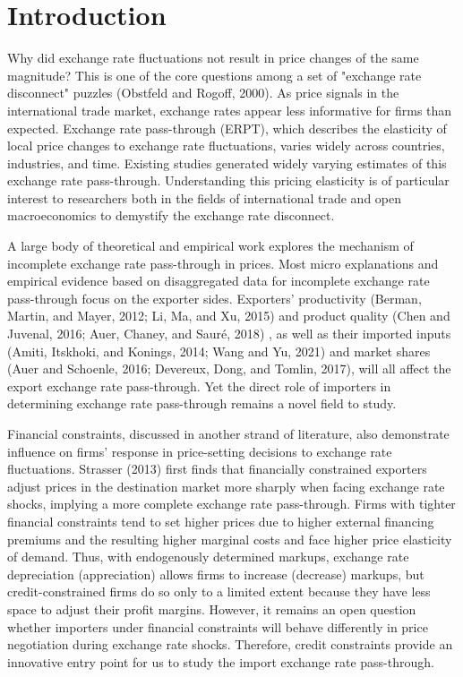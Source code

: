 \chapter{Introduction}\label{sec-1.introduction}

Why did exchange rate fluctuations not result in price changes of the same magnitude? This is one of the core questions among a set of "exchange rate disconnect" puzzles (Obstfeld and Rogoff, 2000\cite{obstfeld2000}). As price signals in the international trade market, exchange rates appear less informative for firms than expected. Exchange rate pass-through (ERPT), which describes the elasticity of local price changes to exchange rate fluctuations, varies widely across countries, industries, and time. Existing studies generated widely varying estimates of this exchange rate pass-through. Understanding this pricing elasticity is of particular interest to researchers both in the fields of international trade and open macroeconomics to demystify the exchange rate disconnect.

A large body of theoretical and empirical work explores the mechanism of incomplete exchange rate pass-through in prices. Most micro explanations and empirical evidence based on disaggregated data for incomplete exchange rate pass-through focus on the exporter sides. Exporters' productivity (Berman, Martin, and Mayer, 2012\cite{bmm2012}; Li, Ma, and Xu, 2015\cite{lmx2015}) and product quality (Chen and Juvenal, 2016\cite{chen2016}; Auer, Chaney, and Sauré, 2018\cite{auer2018}) , as well as their imported inputs (Amiti, Itskhoki, and Konings, 2014\cite{aik2014}; Wang and Yu, 2021\cite{wang-yu2021}) and market shares (Auer and Schoenle, 2016\cite{auer2016}; Devereux, Dong, and Tomlin, 2017\cite{devereux2017}), will all affect the export exchange rate pass-through. Yet the direct role of importers in determining exchange rate pass-through remains a novel field to study. 

Financial constraints, discussed in another strand of literature, also demonstrate influence on firms’ response in price-setting decisions to exchange rate fluctuations. Strasser (2013)\cite{strasser2013} first finds that financially constrained exporters adjust prices in the destination market more sharply when facing exchange rate shocks, implying a more complete exchange rate pass-through. Firms with tighter financial constraints tend to set higher prices due to higher external financing premiums and the resulting higher marginal costs and face higher price elasticity of demand. Thus, with endogenously determined markups, exchange rate depreciation (appreciation) allows firms to increase (decrease) markups, but credit-constrained firms do so only to a limited extent because they have less space to adjust their profit margins. However, it remains an open question whether importers under financial constraints will behave differently in price negotiation during exchange rate shocks. Therefore, credit constraints provide an innovative entry point for us to study the import exchange rate pass-through.


